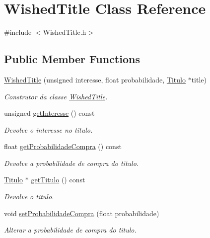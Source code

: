\hypertarget{classWishedTitle}{}\section{Wished\+Title Class Reference}
\label{classWishedTitle}


{\ttfamily \#include $<$Wished\+Title.\+h$>$}

\subsection*{Public Member Functions}
\begin{DoxyCompactItemize}
\item 
\hyperlink{classWishedTitle_a27a60af16f94343ee502445e855a5659}{Wished\+Title} (unsigned interesse, float probabilidade, \hyperlink{classTitulo}{Titulo} $\ast$title)
\begin{DoxyCompactList}\small\item\em Construtor da classe \hyperlink{classWishedTitle}{Wished\+Title}. \end{DoxyCompactList}\item 
unsigned \hyperlink{classWishedTitle_af436ada1ae78a4ffc8031863c0f21859}{get\+Interesse} () const
\begin{DoxyCompactList}\small\item\em Devolve o interesse no titulo. \end{DoxyCompactList}\item 
float \hyperlink{classWishedTitle_a9076a3f48cb0bbd435908c392e5041a9}{get\+Probabilidade\+Compra} () const
\begin{DoxyCompactList}\small\item\em Devolve a probabilidade de compra do titulo. \end{DoxyCompactList}\item 
\hyperlink{classTitulo}{Titulo} $\ast$ \hyperlink{classWishedTitle_a9ca6e92a26bb2f319a39d5a03b0c42bd}{get\+Titulo} () const
\begin{DoxyCompactList}\small\item\em Devolve o titulo. \end{DoxyCompactList}\item 
void \hyperlink{classWishedTitle_aacaf6dfce83390dcc78f0ecd679e1de1}{set\+Probabilidade\+Compra} (float probabilidade)
\begin{DoxyCompactList}\small\item\em Alterar a probabilidade de compra do titulo. \end{DoxyCompactList}\item 

\end{DoxyCompactItemize}
